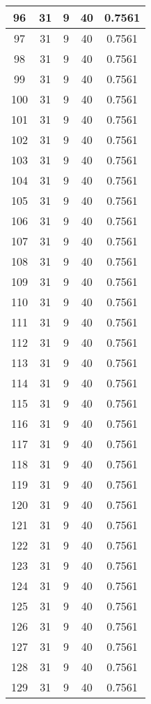 \documentclass[letterpaper, 12pt]{article}
\begin{document}
\begin{longtable}{|c|c|c|c|c|}
\hline
96 & 31 & 9 & 40 & 0.7561 \\
\hline
97 & 31 & 9 & 40 & 0.7561 \\
\hline
98 & 31 & 9 & 40 & 0.7561 \\
\hline
99 & 31 & 9 & 40 & 0.7561 \\
\hline
100 & 31 & 9 & 40 & 0.7561 \\
\hline
101 & 31 & 9 & 40 & 0.7561 \\
\hline
102 & 31 & 9 & 40 & 0.7561 \\
\hline
103 & 31 & 9 & 40 & 0.7561 \\
\hline
104 & 31 & 9 & 40 & 0.7561 \\
\hline
105 & 31 & 9 & 40 & 0.7561 \\
\hline
106 & 31 & 9 & 40 & 0.7561 \\
\hline
107 & 31 & 9 & 40 & 0.7561 \\
\hline
108 & 31 & 9 & 40 & 0.7561 \\
\hline
109 & 31 & 9 & 40 & 0.7561 \\
\hline
110 & 31 & 9 & 40 & 0.7561 \\
\hline
111 & 31 & 9 & 40 & 0.7561 \\
\hline
112 & 31 & 9 & 40 & 0.7561 \\
\hline
113 & 31 & 9 & 40 & 0.7561 \\
\hline
114 & 31 & 9 & 40 & 0.7561 \\
\hline
115 & 31 & 9 & 40 & 0.7561 \\
\hline
116 & 31 & 9 & 40 & 0.7561 \\
\hline
117 & 31 & 9 & 40 & 0.7561 \\
\hline
118 & 31 & 9 & 40 & 0.7561 \\
\hline
119 & 31 & 9 & 40 & 0.7561 \\
\hline
120 & 31 & 9 & 40 & 0.7561 \\
\hline
121 & 31 & 9 & 40 & 0.7561 \\
\hline
122 & 31 & 9 & 40 & 0.7561 \\
\hline
123 & 31 & 9 & 40 & 0.7561 \\
\hline
124 & 31 & 9 & 40 & 0.7561 \\
\hline
125 & 31 & 9 & 40 & 0.7561 \\
\hline
126 & 31 & 9 & 40 & 0.7561 \\
\hline
127 & 31 & 9 & 40 & 0.7561 \\
\hline
128 & 31 & 9 & 40 & 0.7561 \\
\hline
129 & 31 & 9 & 40 & 0.7561 \\

\end{longtable}
\end{document}

